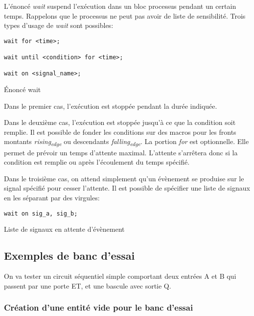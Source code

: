 \documentclass[11pt]{article}
\begin{document}
\begin{enumerate}
L'énoncé \emph{wait} suspend l'exécution dans un bloc processus pendant un
certain temps. Rappelons que le processus ne peut pas avoir de liste
de sensibilité. Trois types d'usage de \emph{wait} sont possibles:

\begin{listing}[htbp]
\begin{verbatim}
wait for <time>; 

wait until <condition> for <time>;

wait on <signal_name>;
\end{verbatim}
\caption{Énoncé wait}
\end{listing}

Dans le premier cas, l'exécution est stoppée pendant la durée
indiquée.

Dans le deuxième cas, l'exécution est stoppée jusqu'à ce que la
condition soit remplie. Il est possible de fonder les conditions sur
des macros pour les fronts montants \emph{rising\textsubscript{edge}} ou descendants
\emph{falling\textsubscript{edge}}. La portion \emph{for} est optionnelle. Elle permet de
prévoir un temps d'attente maximal. L'attente s'arrêtera donc si la
condition est remplie ou après l'écoulement du temps spécifié.

Dans le troisième cas, on attend simplement qu'un évènement se
produise sur le signal spécifié pour cesser l'attente. Il est possible
de spécifier une liste de signaux en les séparant par des virgules:

\begin{listing}[htbp]
\begin{verbatim}
wait on sig_a, sig_b;
\end{verbatim}
\caption{Liste de signaux en attente d'évènement}
\end{listing}
\end{enumerate}


\subsection{Exemples de banc d'essai}
\label{sec:orgbc95fce}

On va tester un circuit séquentiel simple comportant deux entrées A et
B qui passent par une porte ET, et une bascule avec sortie Q.

\subsubsection{Création d'une entité vide pour le banc d'essai}
\label{sec:org8ac9760}
\end{document}
